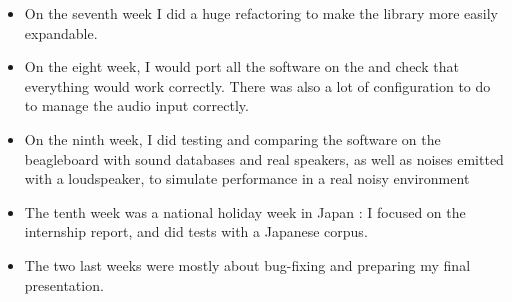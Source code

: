 \begin{itemize}
\item On the seventh week I did a huge refactoring to make the library more easily expandable.
\item On the eight week, I would port all the software on the  and check that everything would work correctly. There was also a lot of configuration to do to manage the audio input correctly.
\item On the ninth week, I did testing and comparing the software on the beagleboard with sound databases and real speakers, as well as noises emitted with a loudspeaker, to simulate performance in a real noisy environment
\item The tenth week was a national holiday week in Japan : I focused on the internship report, and did tests with a Japanese corpus.
\item The two last weeks were mostly about bug-fixing and preparing my final presentation.
\end{itemize}
